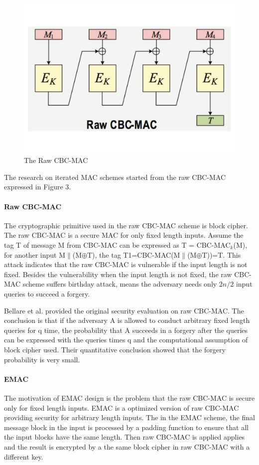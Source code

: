 \documentclass{article}
\begin{document}
\begin{figure}[htbp]
\centering
\includegraphics[scale=0.3]{./diagrams/cbc-mac.pdf}
\caption{The Raw CBC-MAC}
\label{CBC-mac }
\end{figure}
The research on iterated MAC schemes started from the raw CBC-MAC expressed in Figure 3.
\paragraph{Raw CBC-MAC}
The cryptographic primitive used in the raw CBC-MAC scheme is block cipher.  
The raw CBC-MAC is a secure MAC for only fixed length inputs. Assume the tag T of message M from CBC-MAC can be expressed as T = CBC-MAC$_k$(M), for another input M$\|$(M$\oplus$T), the tag T1=CBC-MAC(M$\|$(M$\oplus$T))=T. This attack indicates that the raw CBC-MAC is vulnerable if the input length is not fixed.
Besides the vulnerability when the input length is not fixed, the raw CBC-MAC scheme suffers birthday attack, means the adversary needs only 2$n/2$ input queries to succeed a forgery. 

Bellare et al. provided the original security evaluation on raw CBC-MAC\cite{cbc1994}. The conclusion is that if the adversary A is allowed to conduct arbitrary fixed length queries for q time, the probability that A succeeds in a forgery after the queries can be expressed with the queries times q and the computational assumption of block cipher used. Their quantitative conclusion showed that the forgery probability is very small.

\paragraph{EMAC}
The motivation of EMAC design is the problem that the raw CBC-MAC is secure only for fixed length inputs. 
EMAC is a optimized version of raw CBC-MAC providing security for arbitrary length inputs. The in the EMAC scheme, the final message block in the input is processed by a padding function to ensure that all the input blocks have the same length. Then raw CBC-MAC is applied applies and the result is encrypted by a the same block cipher in raw CBC-MAC with a different key. 
\end{document}
